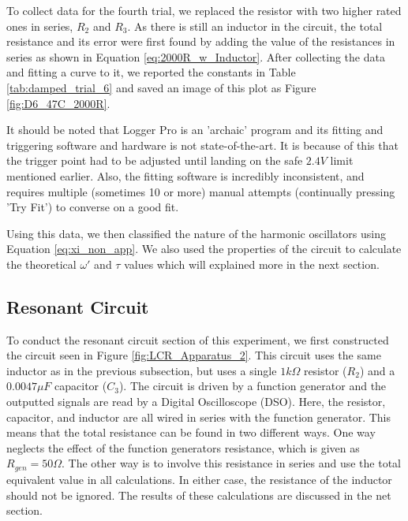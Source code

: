 \documentclass[12pt]{article}
\begin{document}
To collect data for the fourth trial, we replaced the resistor with two higher rated ones in series, $R_2$ and $R_3$. As there is still an inductor in the circuit, the total resistance and its error were first found by adding the value of the resistances in series as shown in Equation \ref{eq:2000R_w_Inductor}. After collecting the data and fitting a curve to it, we reported the constants in Table \ref{tab:damped_trial_6} and saved an image of this plot as Figure \ref{fig:D6_47C_2000R}.

It should be noted that Logger Pro is an 'archaic' program and its fitting and triggering software and hardware is not state-of-the-art. It is because of this that the trigger point had to be adjusted until landing on the safe $2.4V$ limit mentioned earlier. Also, the fitting software is incredibly inconsistent, and requires multiple (sometimes 10 or more) manual attempts (continually pressing 'Try Fit') to converse on a good fit.

Using this data, we then classified the nature of the harmonic oscillators using Equation \ref{eq:xi_non_app}. We also used the properties of the circuit to calculate the theoretical $\omega'$ and $\tau$ values which will explained more in the next section.

\subsection{Resonant Circuit}
To conduct the resonant circuit section of this experiment, we first constructed the circuit seen in Figure \ref{fig:LCR_Apparatus_2}. This circuit uses the same inductor as in the previous subsection, but uses a single $1k\Omega$ resistor ($R_2$) and a $0.0047\mu F$ capacitor ($C_3$). The circuit is driven by a function generator and the outputted signals are read by a Digital Oscilloscope (DSO). Here, the resistor, capacitor, and inductor are all wired in series with the function generator. This means that the total resistance can be found in two different ways. One way neglects the effect of the function generators resistance, which is given as $R_{gen}=50\Omega$. The other way is to involve this resistance in series and use the total equivalent value in all calculations. In either case, the resistance of the inductor should not be ignored. The results of these calculations are discussed in the net section.
\end{document}
